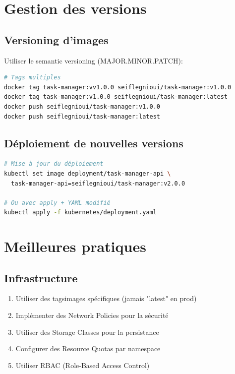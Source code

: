 \documentclass[12pt,a4paper,twoside]{report}
\begin{document}
\section{Gestion des versions}

\subsection{Versioning d'images}

Utiliser le semantic versioning (MAJOR.MINOR.PATCH):

\begin{lstlisting}[language=bash]
# Tags multiples
docker tag task-manager:vv1.0.0 seiflegnioui/task-manager:v1.0.0
docker tag task-manager:v1.0.0 seiflegnioui/task-manager:latest
docker push seiflegnioui/task-manager:v1.0.0
docker push seiflegnioui/task-manager:latest
\end{lstlisting}

\subsection{Déploiement de nouvelles versions}

\begin{lstlisting}[language=bash]
# Mise à jour du déploiement
kubectl set image deployment/task-manager-api \
  task-manager-api=seiflegnioui/task-manager:v2.0.0

# Ou avec apply + YAML modifié
kubectl apply -f kubernetes/deployment.yaml
\end{lstlisting}

\section{Meilleures pratiques}

\subsection{Infrastructure}

\begin{enumerate}
    \item Utiliser des tagsimages spécifiques (jamais "latest" en prod)
    \item Implémenter des Network Policies pour la sécurité
    \item Utiliser des Storage Classes pour la persistance
    \item Configurer des Resource Quotas par namespace
    \item Utiliser RBAC (Role-Based Access Control)
\end{enumerate}
\end{document}
